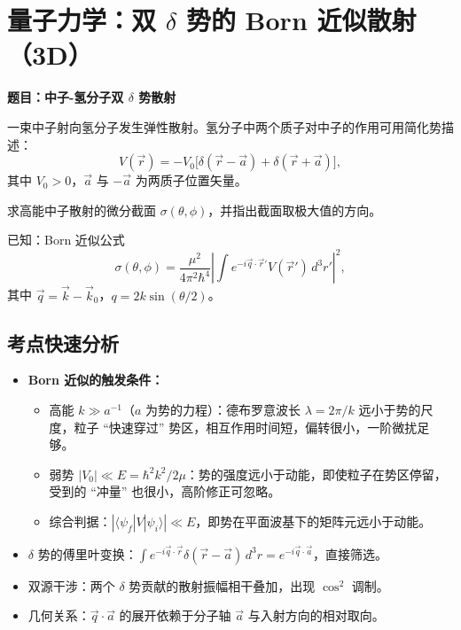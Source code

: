 
\section{量子力学：双 $\delta$ 势的 Born 近似散射（3D）}
\label{sec:born-3d}

\begin{modelbox}
\textbf{题目：中子-氢分子双 $\delta$ 势散射}

一束中子射向氢分子发生弹性散射。氢分子中两个质子对中子的作用可用简化势描述：
\[
V(\vec{r}) = -V_0\bigl[\delta(\vec{r}-\vec{a}) + \delta(\vec{r}+\vec{a})\bigr],
\]
其中 $V_0 > 0$，$\vec{a}$ 与 $-\vec{a}$ 为两质子位置矢量。

求高能中子散射的微分截面 $\sigma(\theta,\phi)$，并指出截面取极大值的方向。

已知：Born 近似公式
\[
\sigma(\theta,\phi) = \frac{\mu^2}{4\pi^2\hbar^4}\left|\int e^{-i\vec{q}\cdot\vec{r}'} V(\vec{r}')\,d^3r'\right|^2,
\]
其中 $\vec{q} = \vec{k} - \vec{k}_0$，$q = 2k\sin(\theta/2)$。
\end{modelbox}

\subsection{考点快速分析}

\begin{tipbox}[考点快速分析]
\begin{itemize}
    \item \textbf{Born 近似的触发条件：}
    \begin{itemize}
        \item 高能 $k \gg a^{-1}$（$a$ 为势的力程）：德布罗意波长 $\lambda = 2\pi/k$ 远小于势的尺度，粒子 ``快速穿过'' 势区，相互作用时间短，偏转很小，一阶微扰足够。
        \item 弱势 $|V_0| \ll E = \hbar^2k^2/2\mu$：势的强度远小于动能，即使粒子在势区停留，受到的 ``冲量'' 也很小，高阶修正可忽略。
        \item 综合判据：$|\langle\psi_f|V|\psi_i\rangle| \ll E$，即势在平面波基下的矩阵元远小于动能。
    \end{itemize}
    \item $\delta$ 势的傅里叶变换：$\int e^{-i\vec{q}\cdot\vec{r}}\delta(\vec{r}-\vec{a})\,d^3r = e^{-i\vec{q}\cdot\vec{a}}$，直接筛选。
    \item 双源干涉：两个 $\delta$ 势贡献的散射振幅相干叠加，出现 $\cos^2$ 调制。
    \item 几何关系：$\vec{q}\cdot\vec{a}$ 的展开依赖于分子轴 $\vec{a}$ 与入射方向的相对取向。
\end{itemize}
\end{tipbox}

